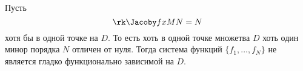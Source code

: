
Пусть
\[\rk\Jacoby fxMN = N\]
хотя бы в одной точке на $D$. То есть хоть в одной точке множетва $D$ хоть один минор порядка $N$ отличен от нуля.
Тогда система функций $\{f_1,\ldots,f_N\}$ не является гладко функционально зависимой на $D$.
